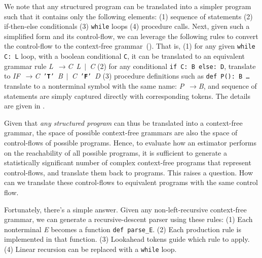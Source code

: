 \documentclass[conference]{IEEEtran}
\def\<#1>{\texttt{#1}}
\def\term#1{\texttt{'\textbf{#1}'}}
\def\nonterm#1{\textlangle\textnormal{\emph{#1}}\textrangle}
\def\expandsto{\(\rightarrow{}\)}
\begin{document}
We note that any structured program can be translated into a simpler program
such that it contains only the following elements:
(1) sequence of statements
(2) if-then-else conditionals
(3) \<while> loops
(4) procedure calls.
Next, given such a simplified form and its control-flow,
we can leverage the following rules to convert the control-flow to the context-free grammar~().
That is, (1) for any given \<while C: L> loop, with a boolean conditional \<C>,
it can be translated to an equivalent grammar rule
  \mbox{\nonterm{L} \expandsto \nonterm{C} \nonterm{L} $|$ \nonterm{C}}
(2) for any conditional \<if C: B else: D>, translate to
  \mbox{\nonterm{IF} \expandsto \nonterm{C} \term{T} \nonterm{B}  $|$ \nonterm{C} \term{F} \nonterm{D}}
(3) procedure definitions such as \<def P(): B \ldots> translate to a nonterminal symbol with the same
name: \mbox{\nonterm{P} \expandsto \nonterm{B}}, and sequence of statements are simply captured
directly with corresponding tokens.
The details are given in .

Given that \emph{any structured program} can thus be translated into a
context-free grammar, the space of possible context-free grammars are also
the space of control-flows of possible programs. Hence, to evaluate how
an estimator performs on the reachability of all possible programs, it is
sufficient to generate a statistically significant number of complex
context-free programs that represent control-flows, and translate them back
to programs. This raises a question. How can we translate these control-flows
to equivalent programs with the same control flow.

Fortunately, there's a simple answer. Given any non-left-recursive context-free
grammar, we can generate a recursive-descent parser using these rules:
(1) Each nonterminal \nonterm{E} becomes a function \<def parse\_E>.
(2) Each production rule is implemented in that function.
(3) Lookahead tokens guide which rule to apply.
(4) Linear recursion can be replaced with a \<while> loop.
\end{document}
